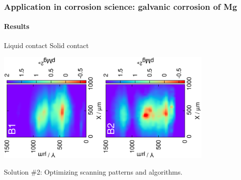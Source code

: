 \documentclass{beamer}
\begin{document}
\begin{frame}
	\frametitle{Application in corrosion science: galvanic corrosion of Mg} 
	\framesubtitle{Results}
	\centering
	\quad\quad\quad\quad Liquid contact \hfill Solid contact \quad\quad\quad\quad\quad

	\includegraphics[trim = 10mm 30mm 0mm 20mm, clip, width=0.4\textwidth, angle=-90]{liquid_coupled.eps}\includegraphics[trim = 10mm 30mm 0mm 20mm, clip, width=0.4\textwidth, angle=-90]{solid_coupled.eps}
\end{frame}



\begin{frame}[plain]
\centering
Solution \#2:
Optimizing scanning patterns and algorithms.
\end{frame}
\end{document}
